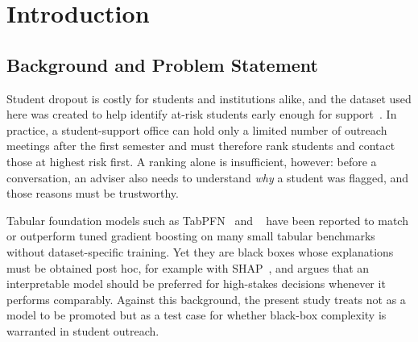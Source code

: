 \section{Introduction}
\label{sec:introduction}

\begin{figure}[t]
\noindent{}
\end{figure}

\subsection{Background and Problem Statement}

Student dropout is costly for students and institutions alike, and the dataset used here was
created to help identify at-risk students early enough for support~\citep{realinho2021uci,
realinho2022predicting}. In practice, a student-support office can hold only a limited number of
outreach meetings after the first semester and must therefore rank students and contact those at
highest risk first. A ranking alone is insufficient, however: before a conversation, an adviser also
needs to understand \emph{why} a student was flagged, and those reasons must be trustworthy.

Tabular foundation models such as TabPFN~\citep{hollmann2025tabpfn} and
\tabicl~\citep{qu2025tabicl} have been reported to match or outperform tuned gradient boosting on
many small tabular benchmarks without dataset-specific training. Yet they are black boxes whose
explanations must be obtained post hoc, for example with SHAP~\citep{lundberg2017shap}, and
\citet{rudin2019stop} argues that an interpretable model should be preferred for high-stakes
decisions whenever it performs comparably. Against this background, the present study treats
\tabicl not as a model to be promoted but as a test case for whether black-box complexity is
warranted in student outreach.

